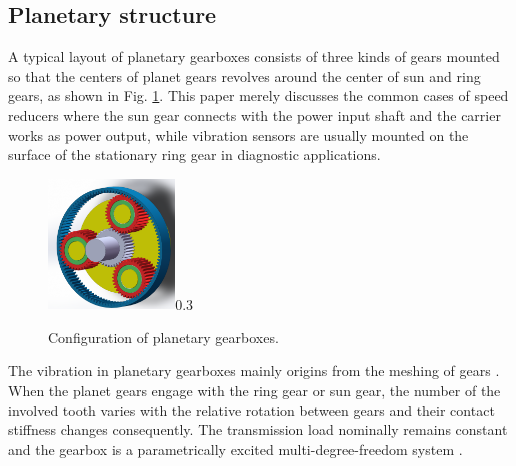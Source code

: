 \documentclass[a4paper,fleqn]{cas-sc}
\begin{document}
\subsection{Planetary structure}
\par A typical layout of planetary gearboxes consists of three kinds of gears mounted so that the centers of planet gears revolves around the center of sun and ring gears, as shown in Fig. \ref{fig:planetary_gearbox_layout}. This paper merely discusses the common cases of speed reducers where the sun gear connects with the power input shaft and the carrier works as power output, while vibration sensors are usually mounted on the surface of the stationary ring gear in diagnostic applications. 
\begin{figure}[pos=htbp]
    \centering
    \begin{annotate}{\includegraphics[width=0.3\textwidth]{Planetary_Gearbox.PNG}}{0.3}
    \end{annotate}
    \caption{Configuration of planetary gearboxes.}
    \label{fig:planetary_gearbox_layout}
\end{figure}
\par The vibration in planetary gearboxes mainly origins from the meshing of gears \cite{Velex1996}. When the planet gears engage with the ring gear or sun gear, the number of the involved tooth varies with the relative rotation between gears and their contact stiffness changes consequently. The transmission load nominally remains constant and the gearbox is a parametrically excited multi-degree-freedom system \cite{Acar2019}. 
\end{document}
